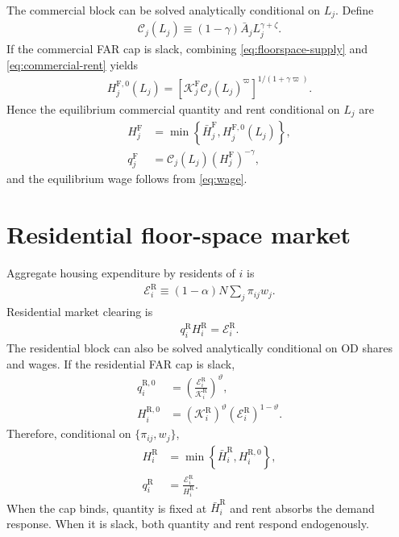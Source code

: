 \documentclass[12pt,a4paper]{article}
\newcommand{\R}{\mathrm{R}}
\newcommand{\F}{\mathrm{F}}
\newcommand{\1}{\mathbb 1}
\begin{document}
The commercial block can be solved analytically conditional on $L_j$. Define
\begin{align}
\mathcal C_j(L_j)
\equiv
(1-\gamma)\bar A_jL_j^{\gamma+\zeta}.
\label{eq:commercial-C}
\end{align}
If the commercial FAR cap is slack, combining \eqref{eq:floorspace-supply} and \eqref{eq:commercial-rent} yields
\begin{align}
H_j^{\F,0}(L_j)
=
\left[
\mathcal K_j^{\F}
\mathcal C_j(L_j)^{\varpi}
\right]^{1/(1+\gamma\varpi)}.
\label{eq:commercial-unconstrained-solution}
\end{align}
Hence the equilibrium commercial quantity and rent conditional on $L_j$ are
\begin{align}
H_j^{\F}
&=
\min\left\{
\bar H_j^{\F},
H_j^{\F,0}(L_j)
\right\},
\label{eq:commercial-quantity-solution}\\
q_j^{\F}
&=
\mathcal C_j(L_j)(H_j^{\F})^{-\gamma},
\label{eq:commercial-price-solution}
\end{align}
and the equilibrium wage follows from \eqref{eq:wage}.

\section{Residential floor-space market}

Aggregate housing expenditure by residents of $i$ is
\begin{align}
\mathcal E_i^{\R}
\equiv
(1-\alpha)N\sum_j\pi_{ij}w_j.
\label{eq:residential-expenditure}
\end{align}
Residential market clearing is
\begin{align}
q_i^{\R}H_i^{\R}=\mathcal E_i^{\R}.
\label{eq:residential-clearing}
\end{align}
The residential block can also be solved analytically conditional on OD shares and wages. If the residential FAR cap is slack,
\begin{align}
q_i^{\R,0}
&=
\left(\frac{\mathcal E_i^{\R}}{\mathcal K_i^{\R}}\right)^{\vartheta},
\label{eq:residential-rent-unconstrained}\\
H_i^{\R,0}
&=
(\mathcal K_i^{\R})^{\vartheta}
(\mathcal E_i^{\R})^{1-\vartheta}.
\label{eq:residential-quantity-unconstrained}
\end{align}
Therefore, conditional on $\{\pi_{ij},w_j\}$,
\begin{align}
H_i^{\R}
&=
\min\left\{
\bar H_i^{\R},
H_i^{\R,0}
\right\},
\label{eq:residential-quantity-solution}\\
q_i^{\R}
&=
\frac{\mathcal E_i^{\R}}{H_i^{\R}}.
\label{eq:residential-price-solution}
\end{align}
When the cap binds, quantity is fixed at $\bar H_i^{\R}$ and rent absorbs the demand response. When it is slack, both quantity and rent respond endogenously.
\end{document}
